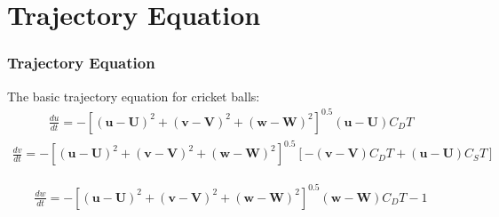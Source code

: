 \documentclass{beamer}
\renewcommand{\vec}[1]{\mathbf{#1}}
\begin{document}
\section{Trajectory Equation}
\begin{frame}
\frametitle{Trajectory Equation}
The basic trajectory equation for cricket balls:\\
\begin{align}
\frac{du}{dt}=-[(\vec{u}-\vec{U})^2+(\vec{v}-\vec{V})^2+(\vec{w}-\vec{W})^2]^{0.5}(\vec{u}-\vec{U})C_D T
\end{align}
\begin{align}
\frac{dv}{dt}=-[(\vec{u}-\vec{U})^2+(\vec{v}-\vec{V})^2+(\vec{w}-\vec{W})^2]^{0.5}[-(\vec{v}-\vec{V})C_D T+(\vec{u}-\vec{U})C_S T]
\end{align}
  
\begin{align}
\frac{dw}{dt}=-[(\vec{u}-\vec{U})^2+(\vec{v}-\vec{V})^2+(\vec{w}-\vec{W})^2]^{0.5}(\vec{w}-\vec{W})C_D T - 1
\end{align}


%  
  
 


\end{frame}
\end{document}
